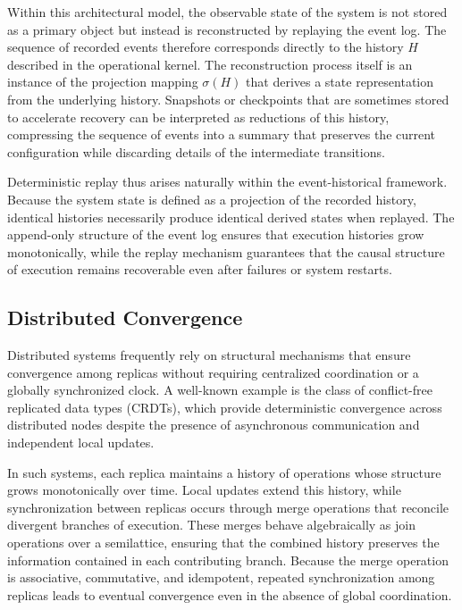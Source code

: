 \documentclass[12pt]{article}
\begin{document}
Within this architectural model, the observable state of
the system is not stored as a primary object but instead
is reconstructed by replaying the event log. The sequence
of recorded events therefore corresponds directly to the
history $H$ described in the operational kernel. The
reconstruction process itself is an instance of the
projection mapping $\sigma(H)$ that derives a state
representation from the underlying history. Snapshots
or checkpoints that are sometimes stored to accelerate
recovery can be interpreted as reductions of this history,
compressing the sequence of events into a summary that
preserves the current configuration while discarding
details of the intermediate transitions.

Deterministic replay thus arises naturally within the
event-historical framework. Because the system state is
defined as a projection of the recorded history, identical
histories necessarily produce identical derived states
when replayed. The append-only structure of the event log
ensures that execution histories grow monotonically, while
the replay mechanism guarantees that the causal structure
of execution remains recoverable even after failures or
system restarts.

\subsection{Distributed Convergence}

Distributed systems frequently rely on structural
mechanisms that ensure convergence among replicas
without requiring centralized coordination or a
globally synchronized clock. A well-known example
is the class of conflict-free replicated data types
(CRDTs), which provide deterministic convergence
across distributed nodes despite the presence of
asynchronous communication and independent local
updates.

In such systems, each replica maintains a history
of operations whose structure grows monotonically
over time. Local updates extend this history,
while synchronization between replicas occurs
through merge operations that reconcile divergent
branches of execution. These merges behave
algebraically as join operations over a semilattice,
ensuring that the combined history preserves the
information contained in each contributing branch.
Because the merge operation is associative,
commutative, and idempotent, repeated synchronization
among replicas leads to eventual convergence even
in the absence of global coordination.
\end{document}
